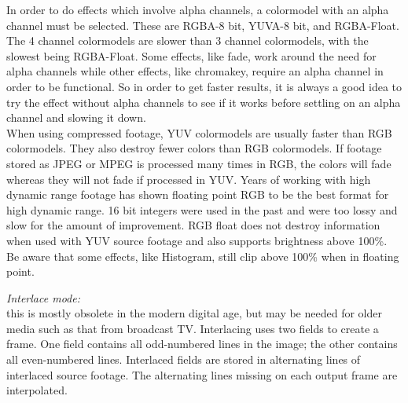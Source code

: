 \noindent \vspace{1ex}In order to do effects which involve alpha channels, a colormodel with an alpha channel must be selected. These are RGBA-8 bit, YUVA-8 bit, and RGBA-Float. The 4 channel colormodels are slower than 3 channel colormodels, with the slowest being RGBA-Float. Some effects, like fade, work around the need for alpha channels while other effects, like chromakey, require an alpha channel in order to be functional.  So in order to get faster results, it is always a good idea to try the effect without alpha channels to see if it works before settling on an alpha channel and slowing it down.\\
When using compressed footage, YUV colormodels are usually faster than RGB colormodels. They also destroy fewer colors than RGB colormodels. If footage stored as JPEG or MPEG is processed many times in RGB, the colors will fade whereas they will not fade if processed in YUV.  Years of working with high dynamic range footage has shown floating point RGB to be the best format for high dynamic range. 16 bit integers were used in the past and were too lossy and slow for the amount of improvement.  RGB float does not destroy information when used with YUV source footage and also supports brightness above 100\%. Be aware that some effects, like Histogram, still clip above 100\% when in floating point.

\textit{Interlace mode:}\\
this is mostly obsolete in the modern digital age, but may be needed for older media such as that from broadcast TV.  Interlacing uses two fields to create a frame. One field contains all odd-numbered lines in the image; the other contains all even-numbered lines.  Interlaced fields are stored in alternating lines of interlaced source footage. The alternating lines missing on each output frame are interpolated.